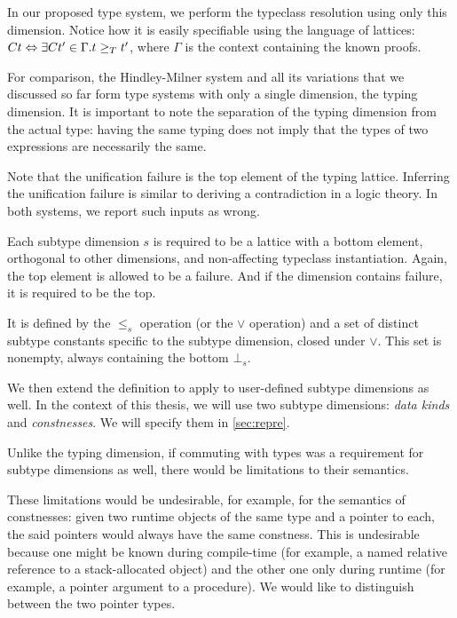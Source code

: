 In our proposed type system, we perform the typeclass resolution using only this dimension. Notice how it is easily specifiable using the language of lattices: $C t \Leftrightarrow \exists C t' \in \Gamma . t \geq_T t'$, where $\Gamma$ is the context containing the known proofs.

For comparison, the Hindley-Milner system and all its variations that we discussed so far form type systems with only a single dimension, the typing dimension. It is important to note the separation of the typing dimension from the actual type: having the same typing does not imply that the types of two expressions are necessarily the same.

Note that the unification failure is the top element of the typing lattice. Inferring the unification failure is similar to deriving a contradiction in a logic theory. In both systems, we report such inputs as wrong.

\begin{defn}
    \label{def:stDim}
    Each subtype dimension $s$ is required to be a lattice with a bottom element, orthogonal to other dimensions, and non-affecting typeclass instantiation. Again, the top element is allowed to be a failure. And if the dimension contains failure, it is required to be the top.

    It is defined by the $\leq_s$ operation (or the $\lor$ operation) and a set of distinct subtype constants specific to the subtype dimension, closed under $\lor$. This set is nonempty, always containing the bottom $\bot_s$.
\end{defn}

We then extend the definition to apply to user-defined subtype dimensions as well. In the context of this thesis, we will use two subtype dimensions: \emph{data kinds} and \emph{constnesses}. We will specify them in \cref{sec:repre}.

\begin{remark}
    \label{congruence}

    Unlike the typing dimension, if commuting with types was a requirement for subtype dimensions as well, there would be limitations to their semantics.

    These limitations would be undesirable, for example, for the semantics of constnesses: given two runtime objects of the same type and a pointer to each, the said pointers would always have the same constness. This is undesirable because one might be known during compile-time (for example, a named relative reference to a stack-allocated object) and the other one only during runtime (for example, a pointer argument to a procedure). We would like to distinguish between the two pointer types.
\end{remark}


